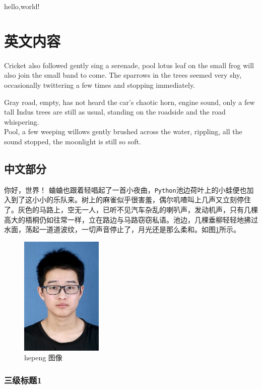 \documentclass[UTF8]{ctexart}
\begin{document}
\tableofcontents

\newpage

hello,world!

\section{英文内容}

Cricket also followed gently sing a serenade, pool lotus leaf on the small frog will also join the small band to come. The sparrows in the trees seemed very shy, occasionally twittering a few times and stopping immediately. 

Gray road, empty, has not heard the car's chaotic horn, engine sound, only a few tall Indus trees are still as usual, standing on the roadside and the road whispering. \\Pool, a few weeping willows gently brushed across the water, rippling, all the sound stopped, the moonlight is still so soft.

\subsection{中文部分}
你好，世界！
蛐蛐也跟着轻唱起了一首小夜曲，\verb|Python|池边荷叶上的小蛙便也加入到了这小小的乐队来。树上的麻雀似乎很害羞，偶尔叽喳叫上几声又立刻停住了。灰色的马路上，空无一人，已听不见汽车杂乱的喇叭声，发动机声，只有几棵高大的梧桐仍如往常一样，立在路边与马路窃窃私语。池边，几棵垂柳轻轻地拂过水面，荡起一道道波纹，一切声音停止了，月光还是那么柔和。如图\ref{img:hepeng}所示。

\begin{figure}[ht]
    \centering
    \includegraphics[width=0.35\textwidth]{hepeng.jpg}
    \caption{hepeng 图像}
    \label{img:hepeng}
\end{figure}

\subsubsection{三级标题1}
\end{document}
